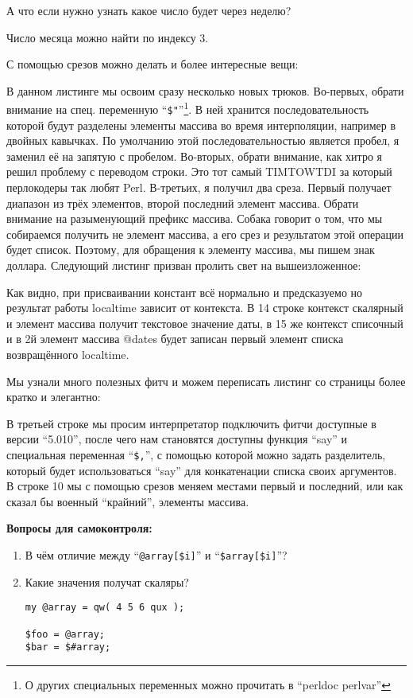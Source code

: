 А что если нужно узнать какое число будет через неделю?


Число месяца можно найти по индексу 3.


С помощью срезов можно делать и более интересные вещи:


В данном листинге мы освоим сразу несколько новых трюков. Во-первых, обрати внимание на спец. переменную
``\texttt{\$"}''\footnote{О других специальных переменных можно прочитать в ``perldoc perlvar''}. В ней хранится
последовательность которой будут разделены элементы массива во время интерполяции, например в двойных
кавычках. По умолчанию этой последовательностью является пробел, я заменил её на запятую с пробелом.
Во-вторых, обрати внимание, как хитро я решил проблему с переводом строки. Это тот самый TIMTOWTDI за
который перлокодеры так любят Perl. В-третьих, я получил два среза.  Первый получает диапазон из трёх
элементов, второй последний элемент массива. Обрати внимание на разыменующий префикс массива. Собака
говорит о том, что мы собираемся получить не элемент массива, а его срез и результатом этой операции
будет список. Поэтому, для обращения к элементу массива, мы пишем знак доллара. Следующий листинг призван
пролить свет на вышеизложенное:


Как видно, при присваивании констант всё нормально и предсказуемо но результат работы localtime зависит
от контекста. В 14 строке контекст скалярный и элемент массива получит текстовое значение даты, в 15 же 
контекст списочный и в 2й элемент массива @dates будет записан первый элемент списка возвращённого
localtime.

Мы узнали много полезных фитч и можем переписать листинг со страницы \pageref{prisoners-src} более 
кратко и элегантно:


В третьей строке мы просим интерпретатор подключить фитчи доступные в версии ``5.010'', после чего нам
становятся доступны функция ``say'' и специальная переменная ``\texttt{\$,}'', с помощью которой можно задать
разделитель, который будет использоваться ``say'' для конкатенации списка своих аргументов. В строке 10 мы с
помощью срезов меняем местами первый и последний, или как сказал бы военный ``крайний'', элементы массива.

{\large{\textbf{Вопросы для самоконтроля:}}}

\begin{enumerate}

  \item В чём отличие между ``\texttt{@array[\$i]}'' и ``\texttt{\$array[\$i]}''?
  \item Какие значения получат скаляры?
\begin{verbatim}
my @array = qw( 4 5 6 qux );

$foo = @array;
$bar = $#array;
\end{verbatim}

\end{enumerate}

